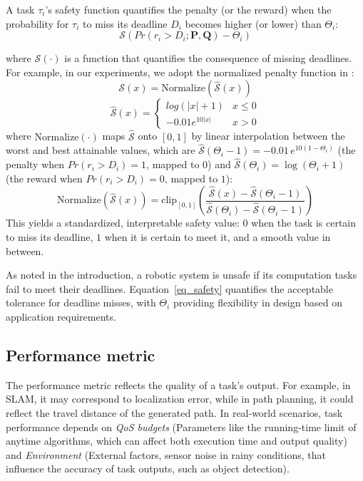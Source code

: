 	\begin{definition}
		A task $\tau_i$'s safety function quantifies the penalty (or the reward) when the probability for $\tau_i$ to miss its deadline $D_i$ becomes higher (or lower) than $\Theta_i$:
		\begin{equation}
			\mathcal{S}(Pr(r_i > D_i ; \boldsymbol{P}, \boldsymbol{Q}) - \Theta_i)
			\label{eq_safety_function}
		\end{equation}
	\end{definition}
	where $\mathcal{S}(\cdot)$ is a function that quantifies the consequence of missing deadlines.
    For example, in our experiments, we adopt the normalized penalty function in \cite{Ash23RAL}:
	\begin{equation}
		\mathcal{S}(x)  = \text{Normalize}(\hat{\mathcal{S}}(x))
	\end{equation}
	\begin{equation}
		\hat{\mathcal{S}}(x) = \begin{cases}
			log(|x|+1) & x \leq 0 \\
			-0.01 e^{10|x|}  & x > 0
		\end{cases}
	\end{equation}
	where $\text{Normalize}(\cdot)$ maps $\hat{\mathcal{S}}$ onto $[0,1]$ by linear interpolation between the worst and best attainable values, which are $\hat{\mathcal{S}}(\Theta_i - 1) = -0.01\,e^{10(1-\Theta_i)}$ (the penalty when $Pr(r_i > D_i) = 1$, mapped to $0$) and $\hat{\mathcal{S}}(\Theta_i) = \log(\Theta_i + 1)$ (the reward when $Pr(r_i > D_i) = 0$, mapped to $1$):
	\begin{equation}
		\text{Normalize}(\hat{\mathcal{S}}(x)) = \mathrm{clip}_{[0,1]}\!\left( \frac{\hat{\mathcal{S}}(x) - \hat{\mathcal{S}}(\Theta_i - 1)}{\hat{\mathcal{S}}(\Theta_i) - \hat{\mathcal{S}}(\Theta_i - 1)} \right)
		\label{eq_normalize}
	\end{equation}
    This yields a standardized, interpretable safety value: $0$ when the task is certain to miss its deadline, $1$ when it is certain to meet it, and a smooth value in between.

    As noted in the introduction, a robotic system is unsafe if its computation tasks fail to meet their deadlines.
    Equation~\eqref{eq_safety} quantifies the acceptable tolerance for deadline misses, with $\Theta_i$ providing flexibility in design based on application requirements.

	\subsection{Performance metric}
	The performance metric reflects the quality of a task’s output.
    For example, in SLAM, it may correspond to localization error, while in path planning, it could reflect the travel distance of the generated path.
    In real-world scenarios, task performance depends on \textit{QoS budgets} (Parameters like the running-time limit of anytime algorithms, which can affect both execution time and output quality) and \textit{Environment} (External factors, \eg sensor noise in rainy conditions, that influence the accuracy of task outputs, such as object detection).

